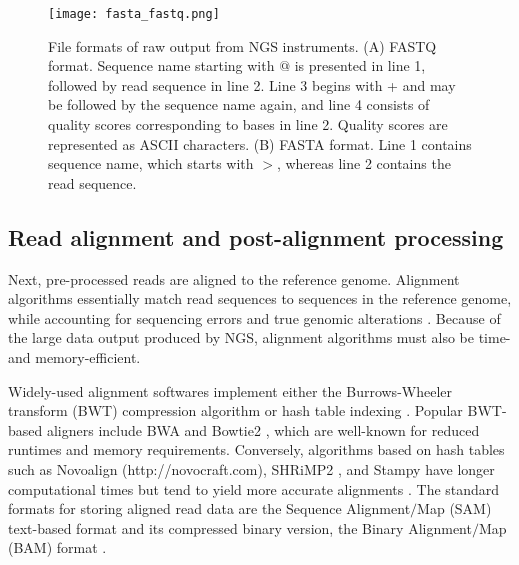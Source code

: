 
\begin{figure}[H]
	\centering
	\texttt{[image: fasta\_fastq.png]}
	\caption[File formats of raw output from NGS instruments.]{File formats of raw output from NGS instruments. (A) FASTQ format. Sequence name starting with $@$ is presented in line 1, followed by read sequence in line 2. Line 3 begins with + and may be followed by the sequence name again, and line 4 consists of quality scores corresponding to bases in line 2. Quality scores are represented as  \acs{ASCII} characters. (B) FASTA format. Line 1 contains sequence name, which starts with $>$, whereas line 2 contains the read sequence.}
	\label{fig:fasta_fastq}
\end{figure}


\subsection{Read alignment and post-alignment processing}

Next, pre-processed reads are aligned to the reference genome. Alignment algorithms essentially match read sequences to sequences in the reference genome, while accounting for sequencing errors and true genomic alterations \cite{Bao2014, Nielsen2011a, Mielczarek2016, Li2010}. Because of the large data output produced by NGS, alignment algorithms must also be time- and memory-efficient.

Widely-used alignment softwares implement either the Burrows-Wheeler transform (\acs{BWT}) compression algorithm or hash table indexing \cite{Bao2014, Nielsen2011a, Pabinger2014, Li2010}. Popular BWT-based aligners include BWA \cite{Li2009, Li2010a, Li2012} and Bowtie2 \cite{Langmead2013}, which are well-known for reduced runtimes and memory requirements. Conversely, algorithms based on hash tables such as Novoalign (http://novocraft.com), SHRiMP2 \cite{David2011}, and Stampy \cite{Lunter2011} have longer computational times but tend to yield more accurate alignments \cite{Bao2014, Nielsen2011a, Li2010}. The standard formats for storing aligned read data are the Sequence Alignment$/$Map (\acs{SAM}) text-based format and its compressed binary version, the Binary Alignment$/$Map (\acs{BAM}) format \cite{Li2009b}.

